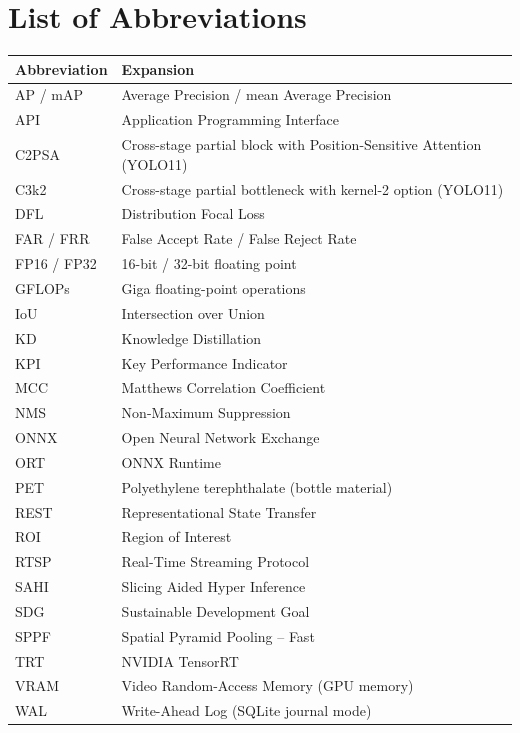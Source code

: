 \documentclass[12pt,a4paper]{report}
\theoremstyle{definition}
\theoremstyle{remark}
\begin{document}
\chapter*{\centering List of Abbreviations}
\begin{center}
\begin{tabularx}{\textwidth}{|l|X|}
\hline
\textbf{Abbreviation} & \textbf{Expansion} \\ \hline
AP / mAP & Average Precision / mean Average Precision \\ \hline
API & Application Programming Interface \\ \hline
C2PSA & Cross-stage partial block with Position-Sensitive Attention (YOLO11) \\ \hline
C3k2 & Cross-stage partial bottleneck with kernel-2 option (YOLO11) \\ \hline
DFL & Distribution Focal Loss \\ \hline
FAR / FRR & False Accept Rate / False Reject Rate \\ \hline
FP16 / FP32 & 16-bit / 32-bit floating point \\ \hline
GFLOPs & Giga floating-point operations \\ \hline
IoU & Intersection over Union \\ \hline
KD & Knowledge Distillation \\ \hline
KPI & Key Performance Indicator \\ \hline
MCC & Matthews Correlation Coefficient \\ \hline
NMS & Non-Maximum Suppression \\ \hline
ONNX & Open Neural Network Exchange \\ \hline
ORT & ONNX Runtime \\ \hline
PET & Polyethylene terephthalate (bottle material) \\ \hline
REST & Representational State Transfer \\ \hline
ROI & Region of Interest \\ \hline
RTSP & Real-Time Streaming Protocol \\ \hline
SAHI & Slicing Aided Hyper Inference \\ \hline
SDG & Sustainable Development Goal \\ \hline
SPPF & Spatial Pyramid Pooling -- Fast \\ \hline
TRT & NVIDIA TensorRT \\ \hline
VRAM & Video Random-Access Memory (GPU memory) \\ \hline
WAL & Write-Ahead Log (SQLite journal mode) \\ \hline
\end{tabularx}
\end{center}
\end{document}
